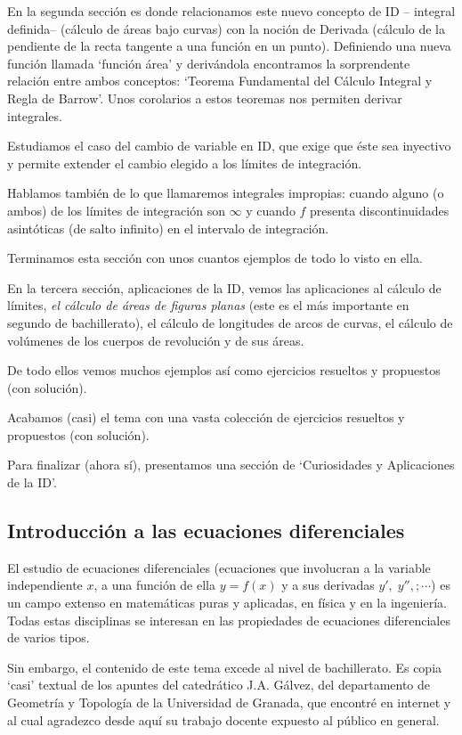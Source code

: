En la segunda sección es donde relacionamos este nuevo concepto de ID -- integral definida--  (cálculo de áreas bajo curvas) con la noción de Derivada (cálculo de la pendiente de la recta tangente a una función en un punto). Definiendo una nueva función llamada `función área' y derivándola encontramos la sorprendente relación entre ambos conceptos: `Teorema Fundamental del Cálculo Integral y Regla de Barrow'. Unos corolarios a estos teoremas nos permiten derivar integrales.

Estudiamos el caso del cambio de variable en ID, que exige que éste sea inyectivo y permite extender el cambio elegido a los límites de integración.

Hablamos también de lo que llamaremos integrales impropias: cuando alguno (o ambos) de los límites de integración son $\infty$ y cuando $f$ presenta discontinuidades asintóticas (de salto infinito) en el intervalo de integración.

Terminamos esta sección con unos cuantos ejemplos de todo lo visto en ella.

En la tercera sección, aplicaciones de la ID, vemos las aplicaciones al cálculo de límites, \emph{el cálculo de áreas de figuras planas} (este es el más importante en segundo de bachillerato), el cálculo de longitudes de arcos de curvas, el cálculo de volúmenes de los cuerpos de revolución y de sus áreas.

De todo ellos vemos muchos ejemplos así como ejercicios resueltos y propuestos (con solución).

Acabamos (casi) el tema con una vasta colección de ejercicios resueltos y propuestos (con solución).

Para finalizar (ahora sí), presentamos una sección de `Curiosidades y Aplicaciones de la ID'.

\subsection{Introducción a las ecuaciones diferenciales}

El estudio de ecuaciones diferenciales (ecuaciones que involucran a la variable independiente $x$, a una función de ella $y=f(x)$ y a sus derivadas $y', \; y'', ; \cdots$)  es un campo extenso en matemáticas puras y aplicadas, en física y en la ingeniería. Todas estas disciplinas se interesan en las propiedades de ecuaciones diferenciales de varios tipos.

Sin embargo, el contenido de este tema excede al nivel de bachillerato.  Es copia `casi' textual de los apuntes del catedrático J.A. Gálvez, del departamento de Geometría y Topología de la Universidad de Granada, que encontré en internet y al cual agradezco desde aquí su trabajo docente expuesto al público en general.

